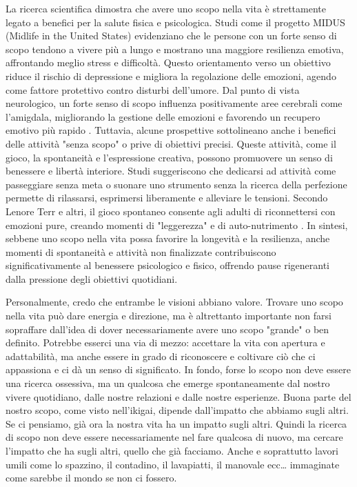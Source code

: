 \documentclass[12pt]{book} %
\begin{document}
\begin{mdframed}[linewidth=1pt]
La ricerca scientifica dimostra che avere uno scopo nella vita è strettamente legato a benefici per la salute fisica e psicologica. Studi come il progetto MIDUS (Midlife in the United States) evidenziano che le persone con un forte senso di scopo tendono a vivere più a lungo e mostrano una maggiore resilienza emotiva, affrontando meglio stress e difficoltà. Questo orientamento verso un obiettivo riduce il rischio di depressione e migliora la regolazione delle emozioni, agendo come fattore protettivo contro disturbi dell’umore. Dal punto di vista neurologico, un forte senso di scopo influenza positivamente aree cerebrali come l’amigdala, migliorando la gestione delle emozioni e favorendo un recupero emotivo più rapido  . Tuttavia, alcune prospettive sottolineano anche i benefici delle attività "senza scopo" o prive di obiettivi precisi. Queste attività, come il gioco, la spontaneità e l’espressione creativa, possono promuovere un senso di benessere e libertà interiore. Studi suggeriscono che dedicarsi ad attività come passeggiare senza meta o suonare uno strumento senza la ricerca della perfezione permette di rilassarsi, esprimersi liberamente e alleviare le tensioni. Secondo Lenore Terr e altri, il gioco spontaneo consente agli adulti di riconnettersi con emozioni pure, creando momenti di "leggerezza" e di auto-nutrimento . In sintesi, sebbene uno scopo nella vita possa favorire la longevità e la resilienza, anche momenti di spontaneità e attività non finalizzate contribuiscono significativamente al benessere psicologico e fisico, offrendo pause rigeneranti dalla pressione degli obiettivi quotidiani.

Personalmente, credo che entrambe le visioni abbiano valore. Trovare uno scopo nella vita può dare energia e direzione, ma è altrettanto importante non farsi sopraffare dall'idea di dover necessariamente avere uno scopo "grande" o ben definito. Potrebbe esserci una via di mezzo: accettare la vita con apertura e adattabilità, ma anche essere in grado di riconoscere e coltivare ciò che ci appassiona e ci dà un senso di significato. In fondo, forse lo scopo non deve essere una ricerca ossessiva, ma un qualcosa che emerge spontaneamente dal nostro vivere quotidiano, dalle nostre relazioni e dalle nostre esperienze. Buona parte del nostro scopo, come visto nell'ikigai, dipende dall'impatto che abbiamo sugli altri. Se ci pensiamo, già ora la nostra vita ha un impatto sugli altri. Quindi la ricerca di scopo non deve essere necessariamente nel fare qualcosa di nuovo, ma cercare l'impatto che ha sugli altri, quello che già facciamo. Anche e soprattutto lavori umili come lo spazzino, il contadino, il lavapiatti, il manovale ecc… immaginate come sarebbe il mondo se non ci fossero.
\end{mdframed}
\end{document}
